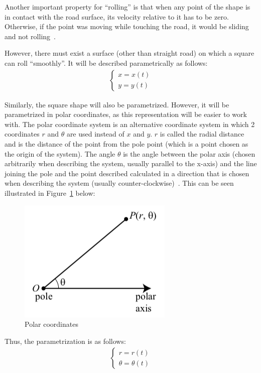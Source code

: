 \documentclass[12pt]{article}
\begin{document}
        Another important property for ``rolling'' is that when any point of the shape is in contact with the road surface, its velocity relative to it has to be zero. Otherwise, if the point was moving while touching the road, it would be sliding and not rolling~\cite{morphocular.2022}.

        However, there must exist a surface (other than straight road) on which a square can roll ``smoothly''. It will be described parametrically as follows:
        \begin{align}
            \begin{cases}
            x = x(t) \\
            y = y(t)
            \end{cases}
        \end{align}

        Similarly, the square shape will also be parametrized. However, it will be parametrized in polar coordinates, as this representation will be easier to work with. The polar coordinate system is an alternative coordinate system in which 2 coordinates $r$ and $\theta$ are used instead of $x$ and $y$. $r$ is called the radial distance and is the distance of the point from the pole point (which is a point chosen as the origin of the system). The angle $\theta$ is the angle between the polar axis (chosen arbitrarily when describing the system, usually parallel to the x-axis) and the line joining the pole and the point described calculated in a direction that is chosen when describing the system (usually counter-clockwise)~\cite{Sundstrom2021Polar}. This can be seen illustrated in Figure~\ref{fig:polar_definition} below:

        \begin{figure}[]
            \centering\includegraphics[width=0.3\linewidth]{images/polar_definition.png}
            \caption[Polar coordinate system]{Polar coordinates~\cite{Sundstrom2021Polar}}\label{fig:polar_definition}
        \end{figure}
        
        Thus, the parametrization is as follows: 
        \begin{align}
            \begin{cases}
            r = r(t) \\
            \theta = \theta(t)
            \end{cases}
        \end{align}
\end{document}
